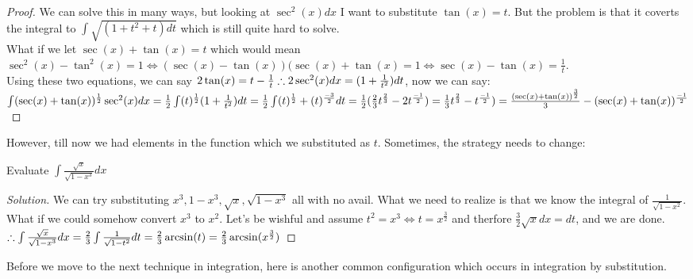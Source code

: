 \begin{proof}
    We can solve this in many ways, but looking at $\sec^2(x)dx$ I want to substitute $\tan(x)=t$. But the problem is that it coverts the integral to $\int \sqrt{(1+t^2+t)dt}$ which is still quite hard to solve.\\
    What if we let $\sec(x)+\tan(x)=t$ which would mean $\sec^2(x)-\tan^2(x)=1 \iff (\sec(x)-\tan(x))(\sec(x)+\tan(x)=1 \iff \sec(x)-\tan(x)=\frac{1}{t}$.\\
    Using these two equations, we can say $2\tan(x)=t-\frac{1}{t}\\
    \therefore 2\sec^2(x)dx=(1+\frac{1}{t^2})dt$, now we can say:\\
    $
    \int (\sec(x)+\tan(x))^{\frac{1}{2}} \sec^2(x) dx\\
    = \frac{1}{2} \int (t)^{\frac{1}{2}}(1+\frac{1}{t^2})dt\\
    = \frac{1}{2} \int (t)^{\frac{1}{2}}+(t)^{\frac{-3}{2}}dt\\
    = \frac{1}{2} (\frac{2}{3} t^{\frac{2}{3}} - 2t^{\frac{-1}{2}})
    = \frac{1}{3} t^{\frac{2}{3}} - t^{\frac{-1}{2}})
    = \frac{(\sec(x)+\tan(x))^{\frac{3}{2}}}{3}-(\sec(x)+\tan(x))^{\frac{-1}{2}}
    $
\end{proof}
However, till now we had elements in the function which we substituted as $t$. Sometimes, the strategy needs to change:\\
\begin{example}
    Evaluate $\int \frac{\sqrt{x}}{\sqrt{1-x^3}} dx $
\end{example}
\begin{proof}
    [Solution]
    We can try substituting $x^3, 1-x^3, \sqrt{x},\sqrt{1-x^3}$ all with no avail. What we need to realize is that we know the integral of $\frac{1}{\sqrt{1-x^2}}$. What if we could somehow convert $x^3$ to $x^2$. Let's be wishful and assume $t^2=x^3 \iff t=x^{\frac{3}{2}}$ and therfore $\frac{3}{2}\sqrt{x}dx=dt$, and we are done.\\
    $
    \therefore \int \frac{\sqrt{x}}{\sqrt{1-x^3}} dx\\
    = \frac{2}{3}\int \frac{1}{\sqrt{1-t^2}} dt\\
    = \frac{2}{3} \arcsin(t)\\
    = \frac{2}{3} \arcsin(x^{\frac{3}{2}})\\
    $
\end{proof}
Before we move to the next technique in integration, here is another common configuration which occurs in integration by substitution.\\
